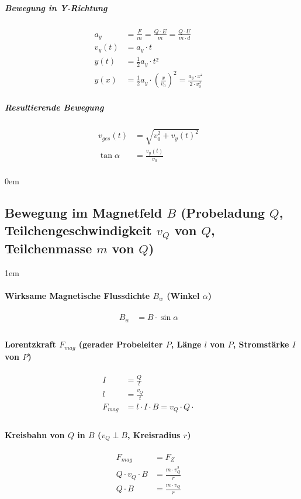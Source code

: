 \subparagraph{Bewegung in Y-Richtung}
\begin{align*}
  a_y &= \frac{F}{m} = \frac{Q \cdot E}{m} = \frac{Q \cdot U}{m \cdot d} &\\
  v_y \left( t \right) &= a_y \cdot t &\\
  y \left( t \right) &= \frac{1}{2}a_y \cdot t² &\\
  y \left( x \right) &= \frac{1}{2}a_y \cdot \left( \frac{x}{v_0}\right)^2 = \frac{a_y \cdot x²}{2
  \cdot v_0^2}
\end{align*}

\subparagraph{Resultierende Bewegung}
\begin{align*}
  v_{ges} \left( t \right) &= \sqrt{v_0 ^ 2 + v_y \left( t \right) ^ 2} &\\
  \tan \alpha &= \frac{v_y \left( t \right)}{v_0} &\\
\end{align*}

\leftskip0em

\subsection{Bewegung im Magnetfeld $B$ (Probeladung $Q$, Teilchengeschwindigkeit $v_Q$ von $Q$,
Teilchenmasse $m$ von $Q$)}

\leftskip1em
\paragraph{Wirksame Magnetische Flussdichte $B_w$ (Winkel $\alpha$)}
\begin{align*}
  B_w &= B \cdot \sin \alpha &\\
\end{align*}

\paragraph{Lorentzkraft $F_{mag}$ (gerader Probeleiter $P$, Länge $l$ von
$P$, Stromstärke $I$ von $P$)}
\begin{align*}
  I &= \frac{Q}{t} &\\
  l &= \frac{v_Q}{t} &\\
  F_{mag} &= l \cdot I \cdot B = v_Q \cdot Q \cdot &\\
\end{align*}

\paragraph{Kreisbahn von $Q$ in $B$ ($v_Q \perp B$, Kreisradius $r$)}
\begin{align*}
  F_{mag} &= F_Z &\\
  Q \cdot v_Q \cdot B &= \frac{m \cdot v_Q^2}{r} &\\
  Q \cdot B &= \frac{m \cdot v_Q}{r} &\\
\end{align*}

